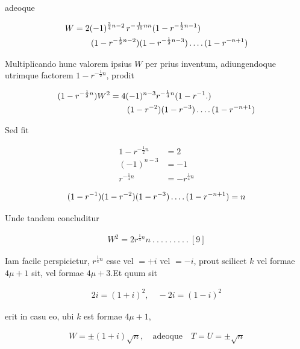 adeoque

\[
\begin{aligned}
W&=2(-1)^{\frac34n-2}\,r^{-\frac1{16}nn}(1-r^{-\frac12n-1})\\&\qquad(1-r^{-\frac12n-2})(1-r^{-\frac12n-3})\mathinner{.\,.\,.\,.}(1-r^{-n+1})
\end{aligned}
\]

Multiplicando hunc valorem ipsius $W$ per prius inventum, adiungendoque utrimque factorem $1-r^{-\frac12n}$, prodit

\[
\begin{aligned}
(1-r^{-\frac12n})W^2&=4(-1)^{n-3}r^{-\frac14n}(1-r^{-1}\mathord{.})\\&\qquad(1-r^{-2})(1-r^{-3})\mathinner{.\,.\,.\,.}(1-r^{-n+1})
\end{aligned}
\]

Sed fit

\[
\begin{aligned}
1-r^{-\frac12n}&=2\\
(-1)^{n-3}&=-1\\
r^{-\frac14n}&=-r^{\frac14n}
\end{aligned}
\]

\[
\begin{aligned}
(1-r^{-1})(1-r^{-2})(1-r^{-3})\mathinner{.\,.\,.\,.}(1-r^{-n+1})=n
\end{aligned}
\]

Unde tandem concluditur

%
\[
\begin{aligned}
W^2=2r^{\frac14n}n\  .\  .\  .\  .\  .\  .\  .\  .\  .\ [9]
\end{aligned}
\]

Iam facile perspicietur, $r^{\frac14n}$ esse vel $=+i$ vel $=-i$, prout scilicet $k$ vel formae $4\mu+1$ sit, vel formae $4\mu+3$.\quad Et quum sit

\[
\begin{aligned}
2i=(1+i)^2,\quad -2i=(1-i)^2
\end{aligned}
\]

erit in casu eo, ubi $k$ est formae $4\mu+1$,

\[
\begin{aligned}
W=\pm(1+i)\surd n,\quad\text{adeoque}\quad T=U=\pm\surd n
\end{aligned}
\]

